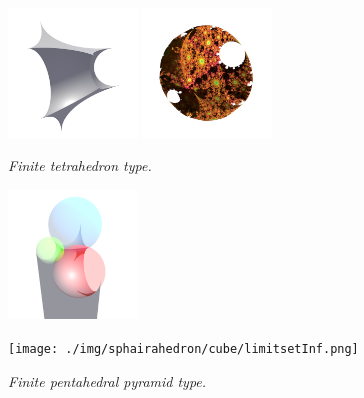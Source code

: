 \documentclass[dvipdfmx]{interact}
\theoremstyle{plain}%
\theoremstyle{definition}
\theoremstyle{remark}
\theoremstyle{problemstyle}
\begin{document}
\begin{figure}[H]
 \begin{minipage}{0.5\textwidth}
  \begin{minipage}[t]{0.24\textwidth}
   \centering
   \includegraphics[width=1.35in, height=1.35in,
   keepaspectratio]{./img/sphairahedron/cube/sphairahedronFinite.png}
  \end{minipage}
  \hspace*{\fill}
  \begin{minipage}[t]{0.24\textwidth}
   \centering
   \includegraphics[width=1.35in, height=1.35in,
   keepaspectratio]{./img/sphairahedron/cube/limitsetFinite.png}
  \end{minipage}
  \hspace*{\fill}
  \caption{\textit{Finite tetrahedron type.}}
  \label{fig:pentahedralPyramidFinite}
 \end{minipage}
 \hspace*{\fill}
 \begin{minipage}{0.5\textwidth}
  \begin{minipage}[t]{0.24\textwidth}
   \centering
   \includegraphics[width=1.35in, height=1.35in,
   keepaspectratio]{./img/sphairahedron/cube/sphairahedronInf.png}
  \end{minipage}
  \hspace*{\fill}
  \begin{minipage}[t]{0.24\textwidth}
   \centering
   \texttt{[image: ./img/sphairahedron/cube/limitsetInf.png]} 
  \end{minipage}
  \hspace*{\fill}
  \caption{\textit{Finite pentahedral pyramid type.}}
  \label{fig:pentahedralPyramidInf}
 \end{minipage}
\end{figure}
\end{document}
